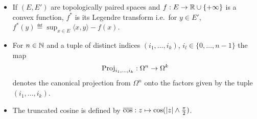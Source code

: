 \begin{itemize}
	\item If $(E,E')$ are topologically paired spaces and $f : E \to \mathbb{R} \cup \{+ \infty\}$ is a convex function, $f^*$ is its Legendre transform i.e.\ for $y \in E'$, $f^*(y) \eqdef \sup_{x\in E} \langle x, y \rangle - f(x) $. %

	\item For $n \in \mathbb{N}$ and a tuple of distinct indices $(i_1,\ldots,i_k)$, $i_l \in \{0,\ldots,n-1\}$ the map
\begin{equation}
	\operatorname{Proj}_{i_1,\ldots,i_k} : \Omega^n \rightarrow \Omega^k
\end{equation}
denotes the canonical projection from $\Omega^n$ onto the factors given by the tuple $(i_1,\ldots,i_k)$.

%

	\item The truncated cosine is defined by ${\overline{\cos}} : z \mapsto \cos(|z|\wedge \frac{\pi}{2})$.
\end{itemize}




